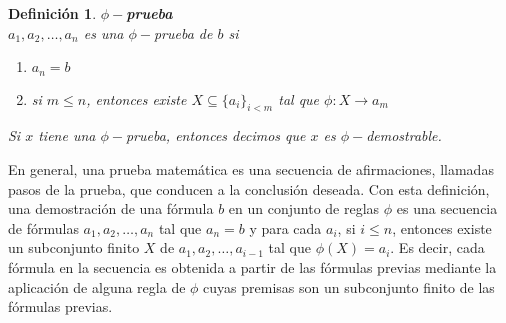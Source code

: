 \documentclass[executivepaper]{article}
\newtheorem{defi}[propo]{Definición}
\begin{document}
\begin{defi}
\textbf{$\phi-$prueba}\\
$a_1, a_2, \ldots, a_n$ es una $\phi-$prueba de $b$ si
\begin{enumerate}
\item $a_n = b$
\item si $m \leq n$, entonces existe $X\subseteq \{a_i\}_{i<m}$ tal que $\phi : X \rightarrow a_m$
\end{enumerate}
Si $x$ tiene una $\phi-$prueba, entonces decimos que $x$ es $\phi-$demostrable.
\end{defi}
En general, una prueba matemática es una secuencia de afirmaciones, llamadas pasos de la prueba, que conducen a la conclusión deseada. Con esta definición, una demostración de una fórmula $b$ en un conjunto de reglas $\phi$ es una secuencia de fórmulas $a_1, a_2, \ldots, a_n$ tal que $a_n=b$ y para cada $a_i$, si $i \leq n$, entonces existe un subconjunto finito $X$ de ${a_1, a_2, \ldots, a_{i-1}}$ tal que $\phi(X)=a_i$. Es decir, cada fórmula en la secuencia es obtenida a partir de las fórmulas previas mediante la aplicación de alguna regla de $\phi$ cuyas premisas son un subconjunto finito de las fórmulas previas.
\end{document}
